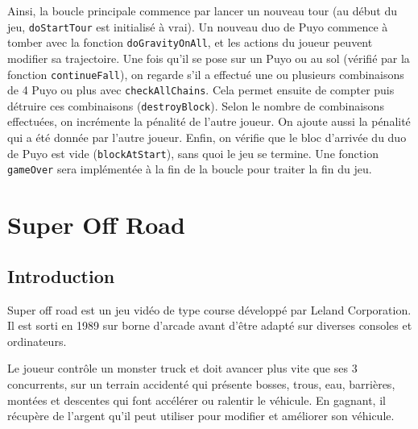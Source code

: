 \documentclass[11pt, final]{report}
\renewcommand{\tt}[1]{\texttt{#1}}
\begin{document}
Ainsi, la boucle principale commence par lancer un nouveau tour (au début du jeu, \tt{doStartTour} est initialisé à vrai). Un nouveau duo de Puyo commence à tomber avec la fonction \tt{doGravityOnAll}, et les actions du joueur peuvent modifier sa trajectoire.  
Une fois qu'il se pose sur un Puyo ou au sol (vérifié par la fonction \tt{continueFall}), on regarde s'il a effectué une ou plusieurs combinaisons de 4 Puyo ou plus avec \tt{checkAllChains}. Cela permet ensuite de compter puis détruire ces combinaisons (\tt{destroyBlock}). Selon le nombre de combinaisons effectuées, on incrémente la pénalité de l'autre joueur. On ajoute aussi la pénalité qui a été donnée par l'autre joueur. Enfin, on vérifie que le bloc d'arrivée du duo de Puyo est vide (\tt{blockAtStart}), sans quoi le jeu se termine. Une fonction \tt{gameOver} sera implémentée à la fin de la boucle pour traiter la fin du jeu. 








































\chapter{Super Off Road}

\section*{Introduction}

Super off road est un jeu vidéo de type course développé par Leland Corporation. Il est sorti en 1989 sur borne d'arcade avant d'être adapté sur diverses consoles et ordinateurs. 

Le joueur contrôle un monster truck et doit avancer plus vite que ses 3 concurrents, sur un terrain accidenté qui présente bosses, trous, eau, barrières, montées et descentes qui font accélérer ou ralentir le véhicule. En gagnant, il récupère de l'argent qu'il peut utiliser pour modifier et améliorer son véhicule. 
\end{document}
